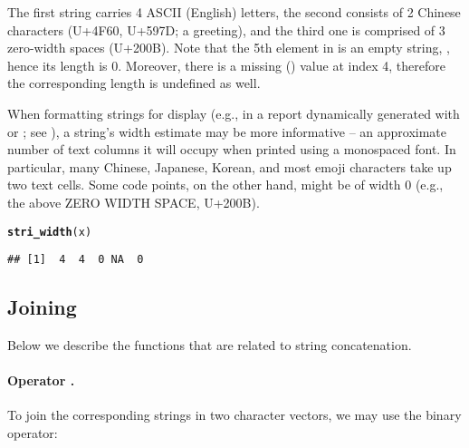 \documentclass[nojss]{jss}\usepackage[]{graphicx}\usepackage[]{xcolor}
\makeatletter
\newcommand{\hlstd}[1]{\textcolor[rgb]{0.345,0.345,0.345}{#1}}%
\newcommand{\hlkwd}[1]{\textcolor[rgb]{0.737,0.353,0.396}{\textbf{#1}}}%
\newenvironment{kframe}{%
 \def\at@end@of@kframe{}%
 \ifinner\ifhmode%
  \def\at@end@of@kframe{\end{minipage}}%
  \begin{minipage}{\columnwidth}%
 \fi\fi%
 \def\FrameCommand##1{\hskip\@totalleftmargin \hskip-\fboxsep
 \colorbox{shadecolor}{##1}\hskip-\fboxsep
     \hskip-\linewidth \hskip-\@totalleftmargin \hskip\columnwidth}%
 \MakeFramed {\advance\hsize-\width
   \@totalleftmargin\z@ \linewidth\hsize
   \@setminipage}}%
 {\par\unskip\endMakeFramed%
 \at@end@of@kframe}
\newenvironment{knitrout}{}{} %
\makeatother
\begin{document}
\noindent
The first string carries 4 ASCII (English) letters,
the second consists of 2 Chinese characters (U+4F60, U+597D; a greeting),
and the third one is comprised of 3 zero-width spaces (U+200B).
Note that the 5th element in  is an empty string, ,
hence its length is  0.
Moreover, there is a missing () value
at index 4, therefore the corresponding length is undefined as well.




When formatting strings for display
(e.g., in a report dynamically generated with 
or ; see \citealp{knitr}),
a string's width estimate may be more informative --
an approximate number of text columns it will occupy when printed
using a monospaced font.
In particular, many Chinese, Japanese, Korean, and most emoji
characters take up two text cells. Some code points, on the other hand,
might be of width 0 (e.g., the above ZERO WIDTH SPACE, U+200B).



\begin{knitrout}
\color{fgcolor}\begin{kframe}
\begin{alltt}
\hlkwd{stri_width}\hlstd{(x)}
\end{alltt}
\begin{verbatim}
## [1]  4  4  0 NA  0
\end{verbatim}
\end{kframe}
\end{knitrout}

\noindent














\subsection{Joining}

Below we describe the functions that are related to string concatenation.


\paragraph{Operator .}
To join  the corresponding strings in two character vectors,
we may use the binary  operator:
\end{document}
